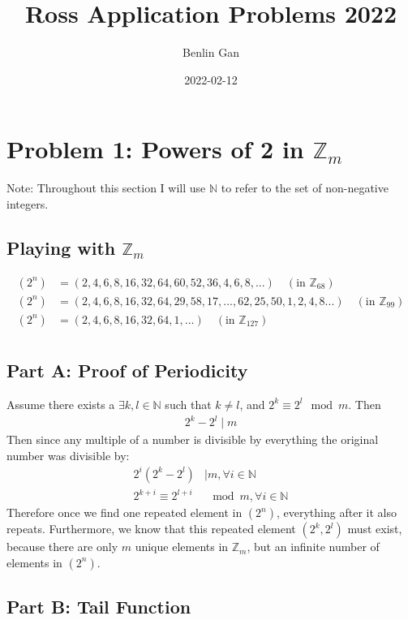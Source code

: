 \documentclass{article}
\title{Ross Application Problems 2022}
\date{2022-02-12}
\author{Benlin Gan}
\begin{document}
  \maketitle
  \newpage
  \section{Problem 1: Powers of 2 in $\mathbb{Z}_m$}
  Note: Throughout this section I will use $\mathbb{N}$ to refer to the set of non-negative integers.
  \subsection{Playing with $\mathbb{Z}_m$}
  \begin{align*}
    (2^n) &= (2, 4, 6, 8, 16, 32, 64, 60, 52, 36, 4, 6, 8, ...)   \hspace{1em}  (\textrm{in } \mathbb{Z}_{68})\\ 
    (2^n) &= (2, 4, 6, 8, 16, 32, 64, 29, 58, 17, ..., 62, 25, 50, 1, 2, 4, 8 ...) \hspace{1em}     (\textrm{in } \mathbb{Z}_{99})\\
    (2^n) &= (2, 4, 6, 8, 16, 32, 64, 1, ...) \hspace{1em}     (\textrm{in } \mathbb{Z}_{127})\\
  \end{align*}
  \subsection{Part A: Proof of Periodicity}
  Assume there exists a $\exists k, l \in \mathbb{N}$ such that $k \neq l$, and $2^k \equiv 2^l \mod m$. Then
  \begin{align}
    2^k - 2^l \mid m
  \end{align}
  Then since any multiple of a number is divisible by everything the original number was divisible by:
  \begin{align}
    2^i(2^k - 2^l) &\mid m, \forall i \in \mathbb{N}\\
    2^{k+i} \equiv 2^{l+i} &\mod m, \forall i \in \mathbb{N}
  \end{align}
  Therefore once we find one repeated element in $(2^n)$, everything after it also repeats. Furthermore, we know that this repeated element $(2^k, 2^l)$ must exist, because there are only $m$ unique elements in $\mathbb{Z}_m$, but an infinite number of elements in $(2^n)$.
  \subsection{Part B: Tail Function}
\end{document}
